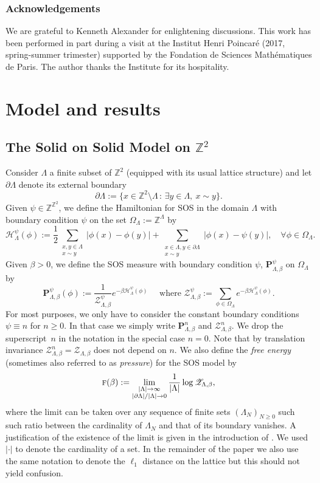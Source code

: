 \documentclass[JEP,XML,SOM,Unicode, NoFloatCountersInSection]{cedram}
\let\mathcal\mathscr
\newcommand{\sep}{\,:\,}
\numberwithin{equation}{section}
\theoremstyle{plain}
\theoremstyle{definition}
\newcommand{\cH}{{\ensuremath{\mathcal H}} }
\newcommand{\cZ}{{\ensuremath{\mathcal Z}} }
\newcommand{\bP}{{\ensuremath{\mathbf P}} }
\newcommand{\sumtwo}[2]{\sum_{\substack{#1 \\ #2}}}
\newcommand{\limtwo}[2]{\lim_{\substack{#1 \\ #2}}}
\newcommand{\bbZ}{{\ensuremath{\mathbb Z}} }
\newcommand{\gb}{\beta}
\newcommand{\gO}{\Omega}
\newcommand{\gL}{\Lambda}
\newcommand{\tf}{\textsc{f}}
\begin{document}
\subsubsection*{Acknowledgements}
We are grateful to Kenneth Alexander for enlightening discussions.
This work has been performed in part
during a visit at the Institut Henri Poincaré (2017, spring-summer trimester) supported by the Fondation de Sciences
Mathématiques de Paris. The author thanks the Institute for its hospitality.

\section{Model and results}

\subsection{The Solid on Solid Model on $\bbZ^2$}

Consider $\gL$ a finite subset of $\bbZ^2$ (equipped with its usual lattice structure) and let $\partial \gL$ denote its external boundary
\[
\partial \gL:= \{ x \in \bbZ^2 \setminus \gL \sep \exists y \in \gL, \ x \sim y \}.
\]
Given $\psi\in \bbZ^{\bbZ^2}$, we define the Hamiltonian for SOS in the domain $\gL$ with boundary condition $\psi$ on the set $\gO_{\gL}:= \bbZ^\gL$ by
\begin{equation}\label{defhamil}
\cH^{\psi}_\gL(\phi):= \frac{1}{2}\sumtwo{x, y \in \gL}{ x \sim y} |\phi(x)-\phi(y)|
+\sumtwo{x\in \gL, y\in \partial\gL}{x\sim y} |\phi(x)-\psi(y)|, \quad \forall \phi \in \gO_{\gL}.
\end{equation}
Given $\gb>0$, we define
the SOS measure with boundary condition $\psi$, $\bP^{\psi}_{\gL,\gb}$ on $\gO_{\gL}$ by
\begin{equation*}%
\bP^{\psi}_{\gL,\gb}(\phi):= \frac{1}{\mathcal Z^{\psi}_{\gL,\gb}}e^{-\gb\cH^{\psi}_\gL(\phi)} \quad \text{ where }
\mathcal Z^{\psi}_{\gL,\gb}:=\sum_{\phi\in \gO_{\gL}} e^{-\gb\cH^{\psi}_\gL(\phi)}.
\end{equation*}
For most purposes, we only have to consider the constant boundary conditions $\psi \equiv n$ for $n\ge 0$.
In that case we simply write $\bP^{n}_{\gL,\gb}$ and $\cZ^{n}_{\gL,\gb}$.
We drop the superscript~$n$ in the notation in the special case $n=0$.
Note that by translation invariance $\mathcal Z^n_{\gL,\gb}=\mathcal Z_{\gL,\gb}$ does not depend on $n$.
We also define the \textit{free energy} (sometimes also referred to as \textit{pressure}) for the SOS model by
\begin{equation*}
\tf(\gb):=\limtwo{|\gL|\to \infty}{|\partial\gL|/|\gL|\to 0} \frac{1}{|\gL|}\log \cZ_{\gL,\gb},
\end{equation*}
where the limit can be taken over any sequence of finite sets $(\gL_N)_{N\ge 0}$ such such ratio between the cardinality of
$\gL_N$ and that of its boundary vanishes. A justification of the existence of the limit is given in the introduction of \cite{cf:part1}.
We used $|\cdot|$ to denote the cardinality of a set. In the remainder of the paper we also use the same notation to denote the $\ell_1$ distance on the lattice but this should not yield confusion.
\end{document}
